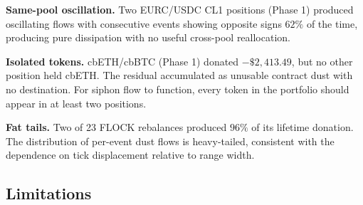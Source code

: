 \documentclass[11pt,a4paper]{article}
\begin{document}
\textbf{Same-pool oscillation.} Two EURC/USDC CL1 positions (Phase 1) produced oscillating flows with consecutive events showing opposite signs $62\%$ of the time, producing pure dissipation with no useful cross-pool reallocation.

\textbf{Isolated tokens.} cbETH/cbBTC (Phase 1) donated $-\$2{,}413.49$, but no other position held cbETH. The residual accumulated as unusable contract dust with no destination. For siphon flow to function, every token in the portfolio should appear in at least two positions.

\textbf{Fat tails.} Two of 23 FLOCK rebalances produced $96\%$ of its lifetime donation. The distribution of per-event dust flows is heavy-tailed, consistent with the dependence on tick displacement relative to range width.

\subsection{Limitations}\label{sec:limitations}
\end{document}
